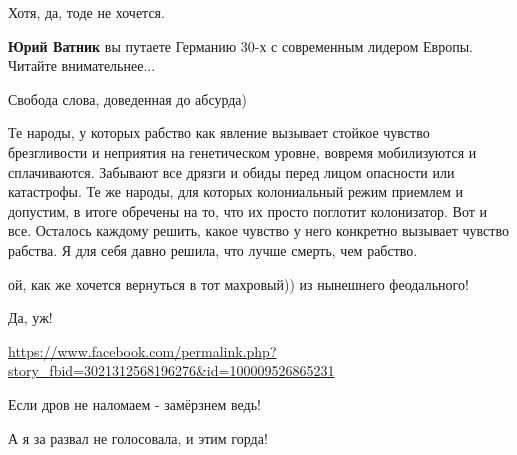 \begin{itemize}
Хотя, да, тоде не хочется.

\begin{itemize} %
\textbf{Юрий Ватник} вы путаете Германию 30-х с современным лидером Европы. Читайте внимательнее...
\end{itemize} %

Свобода слова, доведенная до абсурда)


Те народы, у которых рабство как явление вызывает стойкое чувство брезгливости
и неприятия на генетическом уровне, вовремя мобилизуются и сплачиваются.
Забывают все дрязги и обиды перед лицом опасности или катастрофы. Те же народы,
для которых колониальный режим приемлем и допустим, в итоге обречены на то, что
их просто поглотит колонизатор. Вот и все. Осталось каждому решить, какое
чувство у него конкретно вызывает чувство рабства. Я для себя давно решила, что
лучше смерть, чем рабство.


ой, как же хочется вернуться в тот махровый)) из нынешнего феодального!

Да, уж!


\url{https://www.facebook.com/permalink.php?story_fbid=3021312568196276&id=100009526865231}

Если дров не наломаем - замёрзнем ведь!

А я за развал не голосовала, и этим горда!




\end{itemize} %
